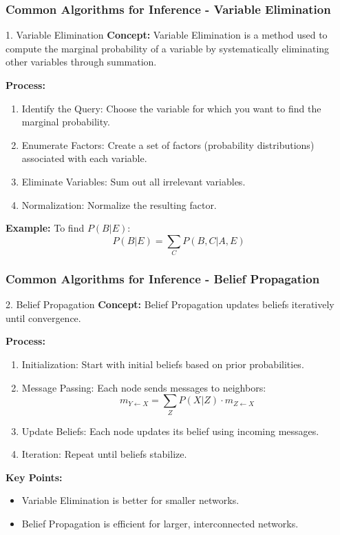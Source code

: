 \documentclass[aspectratio=169]{beamer}
\begin{document}
\begin{frame}[fragile]
    \frametitle{Common Algorithms for Inference - Variable Elimination}
    \begin{block}{1. Variable Elimination}
        \textbf{Concept:}  
        Variable Elimination is a method used to compute the marginal probability of a variable by systematically eliminating other variables through summation.

        \textbf{Process:}
        \begin{enumerate}
            \item Identify the Query: Choose the variable for which you want to find the marginal probability.
            \item Enumerate Factors: Create a set of factors (probability distributions) associated with each variable.
            \item Eliminate Variables: Sum out all irrelevant variables.
            \item Normalization: Normalize the resulting factor.
        \end{enumerate}
        
        \textbf{Example:}  
        To find \( P(B | E) \):
        \[
        P(B | E) = \sum_{C} P(B, C | A, E)
        \]
    \end{block}
\end{frame}

\begin{frame}[fragile]
    \frametitle{Common Algorithms for Inference - Belief Propagation}
    \begin{block}{2. Belief Propagation}
        \textbf{Concept:}  
        Belief Propagation updates beliefs iteratively until convergence.

        \textbf{Process:}
        \begin{enumerate}
            \item Initialization: Start with initial beliefs based on prior probabilities.
            \item Message Passing: Each node sends messages to neighbors:
            \[
            m_{Y \leftarrow X} = \sum_{Z} P(X | Z) \cdot m_{Z \leftarrow X}
            \]
            \item Update Beliefs: Each node updates its belief using incoming messages.
            \item Iteration: Repeat until beliefs stabilize.
        \end{enumerate}

        \textbf{Key Points:}
        \begin{itemize}
            \item Variable Elimination is better for smaller networks.
            \item Belief Propagation is efficient for larger, interconnected networks.
        \end{itemize}
    \end{block}
\end{frame}
\end{document}

